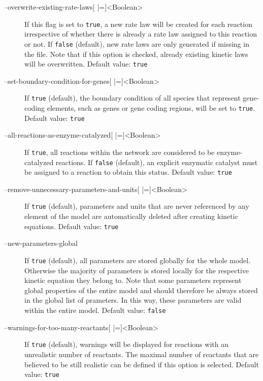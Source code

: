 \begin{description}
\item[--overwrite-existing-rate-laws{[} |={]}<Boolean>]
  If this flag is set to \texttt{true}, a new rate law will be created for
  each reaction irrespective of whether there is already a rate
  law assigned to this reaction or not. If \texttt{false} (default), new
  rate laws are only generated if missing in the \SBML file. Note
  that if this option is checked, already existing kinetic laws
  will be overwritten.
  Default value: \texttt{true}

\item[--set-boundary-condition-for-genes{[} |={]}<Boolean>]
  If \texttt{true} (default), the boundary condition of all species that
  represent gene-coding elements, such as genes or gene coding
  regions, will be set to \texttt{true}.
  Default value: \texttt{true}

\item[--all-reactions-as-enzyme-catalyzed{[} |={]}<Boolean>]
  If \texttt{true}, all reactions within the network are considered to be
  enzyme-catalyzed reactions. If \texttt{false} (default), an explicit
  enzymatic catalyst must be assigned to a reaction to obtain
  this status.
  Default value: \texttt{true}

\item[--remove-unnecessary-parameters-and-units{[} |={]}<Boolean>]
  If \texttt{true} (default), parameters and units that are never referenced
  by any element of the model are automatically deleted after
  creating kinetic equations.
  Default value: \texttt{true}

\item[--new-parameters-global]
  If \texttt{true} (default), all parameters are stored globally for the
  whole model. Otherwise the majority of parameters is stored
  locally for the respective kinetic equation they belong to.
  Note that some parameters represent global properties of the
  entire model and should therefore be always stored in the global
  list of prameters. In this way, these parameters are valid within
  the entire model.
  Default value: \texttt{false}

\item[--warnings-for-too-many-reactants{[} |={]}<Boolean>]
  If \texttt{true} (default), warnings will be displayed for reactions with
  an unrealistic number of reactants. The maximal number of reactants
  that are believed to be still realistic can be defined if this
  option is selected.
  Default value: \texttt{true}


\end{description}
